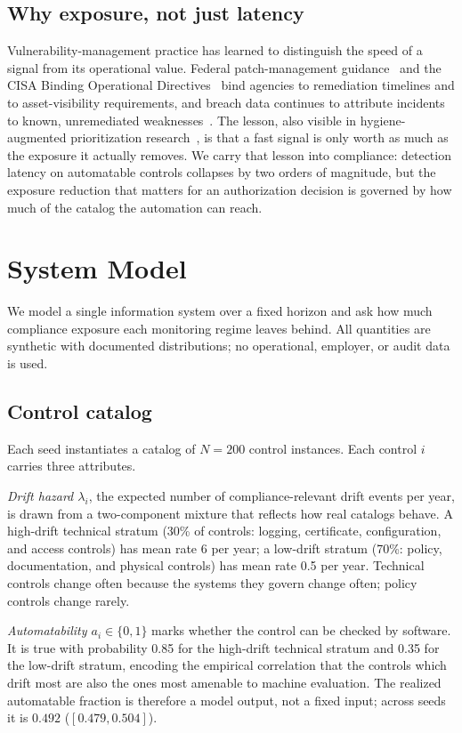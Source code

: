 \documentclass[journal]{IEEEtran}
\begin{document}
\subsection{Why exposure, not just latency}
Vulnerability-management practice has learned to distinguish the speed of a signal from its
operational value. Federal patch-management guidance~\cite{nist2022sp80040r4} and the CISA Binding
Operational Directives~\cite{cisabod2201,cisabod2301} bind agencies to remediation timelines and to
asset-visibility requirements, and breach data continues to attribute incidents to known,
unremediated weaknesses~\cite{verizon2026dbir}. The lesson, also visible in hygiene-augmented
prioritization research~\cite{paper4hygieneprio,paper1vulnprio}, is that a fast signal is only
worth as much as the exposure it actually removes. We carry that lesson into compliance: detection
latency on automatable controls collapses by two orders of magnitude, but the exposure reduction
that matters for an authorization decision is governed by how much of the catalog the automation
can reach.

\section{System Model}
We model a single information system over a fixed horizon and ask how much compliance exposure each
monitoring regime leaves behind. All quantities are synthetic with documented distributions; no
operational, employer, or audit data is used.

\subsection{Control catalog}
Each seed instantiates a catalog of $N = 200$ control instances. Each control $i$ carries three
attributes.

\emph{Drift hazard $\lambda_i$}, the expected number of compliance-relevant drift events per year,
is drawn from a two-component mixture that reflects how real catalogs behave. A high-drift
technical stratum (30\% of controls: logging, certificate, configuration, and access controls) has
mean rate 6 per year; a low-drift stratum (70\%: policy, documentation, and physical controls) has
mean rate 0.5 per year. Technical controls change often because the systems they govern change
often; policy controls change rarely.

\emph{Automatability $a_i \in \{0,1\}$} marks whether the control can be checked by software. It is
true with probability 0.85 for the high-drift technical stratum and 0.35 for the low-drift stratum,
encoding the empirical correlation that the controls which drift most are also the ones most
amenable to machine evaluation. The realized automatable fraction is therefore a model output, not
a fixed input; across seeds it is $0.492$ ($[0.479, 0.504]$).
\end{document}
